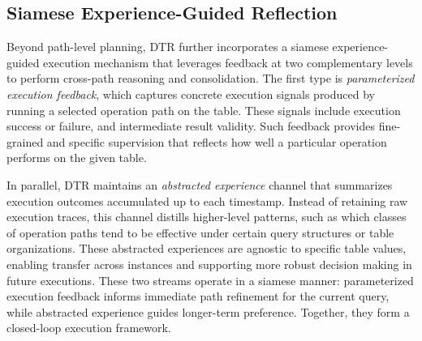 \subsection{Siamese Experience-Guided Reflection}

Beyond path-level planning, DTR further incorporates a siamese experience-guided execution mechanism that leverages feedback at two complementary levels to perform cross-path reasoning and consolidation. The first type is \emph{parameterized execution feedback}, which captures concrete execution signals produced by running a selected operation path on the table. These signals include execution success or failure, and intermediate result validity. Such feedback provides fine-grained and specific supervision that reflects how well a particular operation performs on the given table.

In parallel, DTR maintains an \emph{abstracted experience} channel that summarizes execution outcomes accumulated up to each timestamp. Instead of retaining raw execution traces, this channel distills higher-level patterns, such as which classes of operation paths tend to be effective under certain query structures or table organizations. These abstracted experiences are agnostic to specific table values, enabling transfer across instances and supporting more robust decision making in future executions. These two streams operate in a siamese manner: parameterized execution feedback informs immediate path refinement for the current query, while abstracted experience guides longer-term preference. Together, they form a closed-loop execution framework.

